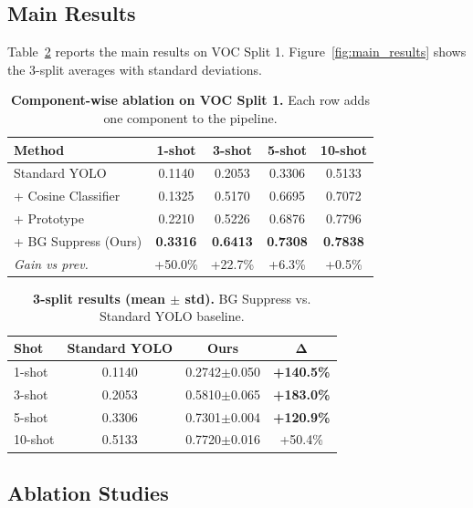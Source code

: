\documentclass[10pt,twocolumn,letterpaper]{article}
\begin{document}
\subsection{Main Results}

Table~\ref{tab:main_results} reports the main results on VOC Split 1.
Figure~\ref{fig:main_results} shows the 3-split averages with standard deviations.

\begin{table}[t]
\centering
\caption{\textbf{Component-wise ablation on VOC Split 1.}
Each row adds one component to the pipeline.}
\label{tab:ablation}
\begin{tabular}{lcccc}
\toprule
\textbf{Method} & \textbf{1-shot} & \textbf{3-shot} & \textbf{5-shot} & \textbf{10-shot} \\
\midrule
Standard YOLO & 0.1140 & 0.2053 & 0.3306 & 0.5133 \\
+ Cosine Classifier & 0.1325 & 0.5170 & 0.6695 & 0.7072 \\
+ Prototype & 0.2210 & 0.5226 & 0.6876 & 0.7796 \\
+ BG Suppress (Ours) & \textbf{0.3316} & \textbf{0.6413} & \textbf{0.7308} & \textbf{0.7838} \\
\midrule
\textit{Gain vs prev.} & +50.0\% & +22.7\% & +6.3\% & +0.5\% \\
\bottomrule
\end{tabular}
\end{table}

\begin{table}[t]
\centering
\caption{\textbf{3-split results (mean $\pm$ std).}
BG Suppress vs. Standard YOLO baseline.}
\label{tab:main_results}
\begin{tabular}{lccc}
\toprule
\textbf{Shot} & \textbf{Standard YOLO} & \textbf{Ours} & $\mathbf{\Delta}$ \\
\midrule
1-shot & 0.1140 & 0.2742$\pm$0.050 & \textbf{+140.5\%} \\
3-shot & 0.2053 & 0.5810$\pm$0.065 & \textbf{+183.0\%} \\
5-shot & 0.3306 & 0.7301$\pm$0.004 & \textbf{+120.9\%} \\
10-shot & 0.5133 & 0.7720$\pm$0.016 & +50.4\% \\
\bottomrule
\end{tabular}
\end{table}

\subsection{Ablation Studies}
\end{document}

